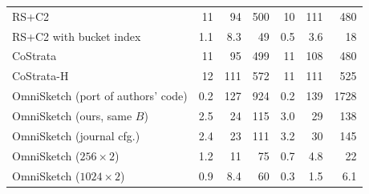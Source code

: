 \begin{tabular}{lrrrrrr}
RS+C2 & 11 & 94 & 500 & 10 & 111 & 480 \\
RS+C2 with bucket index & 1.1 & 8.3 & 49 & 0.5 & 3.6 & 18 \\
CoStrata & 11 & 95 & 499 & 11 & 108 & 480 \\
CoStrata-H & 12 & 111 & 572 & 11 & 111 & 525 \\
OmniSketch (port of authors' code) & 0.2 & 127 & 924 & 0.2 & 139 & 1728 \\
OmniSketch (ours, same $B$) & 2.5 & 24 & 115 & 3.0 & 29 & 138 \\
OmniSketch (journal cfg.) & 2.4 & 23 & 111 & 3.2 & 30 & 145 \\
OmniSketch ($256{\times}2$) & 1.2 & 11 & 75 & 0.7 & 4.8 & 22 \\
OmniSketch ($1024{\times}2$) & 0.9 & 8.4 & 60 & 0.3 & 1.5 & 6.1 \\
\bottomrule
\end{tabular}
